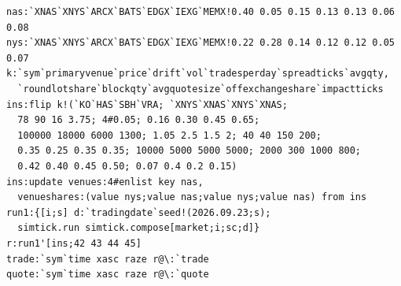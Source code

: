 \documentclass[11pt,a4paper]{article}
\theoremstyle{paper}
\begin{document}
\begin{small}
\begin{verbatim}
nas:`XNAS`XNYS`ARCX`BATS`EDGX`IEXG`MEMX!0.40 0.05 0.15 0.13 0.13 0.06 0.08
nys:`XNAS`XNYS`ARCX`BATS`EDGX`IEXG`MEMX!0.22 0.28 0.14 0.12 0.12 0.05 0.07
k:`sym`primaryvenue`price`drift`vol`tradesperday`spreadticks`avgqty,
  `roundlotshare`blockqty`avgquotesize`offexchangeshare`impactticks
ins:flip k!(`KO`HAS`SBH`VRA; `XNYS`XNAS`XNYS`XNAS;
  78 90 16 3.75; 4#0.05; 0.16 0.30 0.45 0.65;
  100000 18000 6000 1300; 1.05 2.5 1.5 2; 40 40 150 200;
  0.35 0.25 0.35 0.35; 10000 5000 5000 5000; 2000 300 1000 800;
  0.42 0.40 0.45 0.50; 0.07 0.4 0.2 0.15)
ins:update venues:4#enlist key nas,
  venueshares:(value nys;value nas;value nys;value nas) from ins
run1:{[i;s] d:`tradingdate`seed!(2026.09.23;s);
  simtick.run simtick.compose[market;i;sc;d]}
r:run1'[ins;42 43 44 45]
trade:`sym`time xasc raze r@\:`trade
quote:`sym`time xasc raze r@\:`quote
\end{verbatim}
\end{small}
\end{document}
